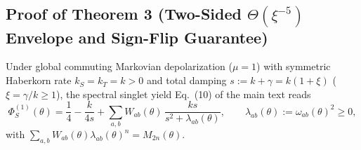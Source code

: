 \documentclass[onecolumn,10pt,notitlepage,amsmath,amssymb,floatfix]{revtex4-2}
\theoremstyle{plain}
\theoremstyle{definition}
\begin{document}
\subsection{Proof of Theorem 3 (Two-Sided \texorpdfstring{$\Theta(\xi^{-5})$}{Theta(xi\^{}(-5))} Envelope and Sign-Flip Guarantee)}

Under global commuting Markovian depolarization ($\mu = 1$) with symmetric Haberkorn rate $k_S = k_T = k > 0$ and total damping $s := k + \gamma = k(1+\xi)$ ($\xi = \gamma/k \ge 1$), the spectral singlet yield Eq.~(10) of the main text reads
\begin{equation}
\label{eq:S2_phi1}
\Phi_S^{(1)}(\theta) = \frac{1}{4} - \frac{k}{4s} + \sum_{a,b} W_{ab}(\theta)\,\frac{ks}{s^2 + \lambda_{ab}(\theta)}, \qquad \lambda_{ab}(\theta) := \omega_{ab}(\theta)^2 \ge 0,
\end{equation}
with $\sum_{a,b} W_{ab}(\theta)\lambda_{ab}(\theta)^n = M_{2n}(\theta)$.
\end{document}
